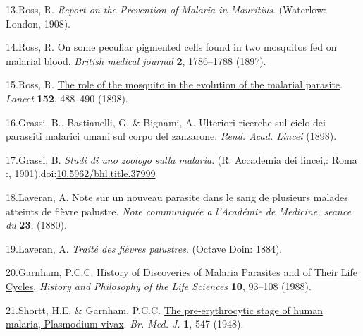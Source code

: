 \documentclass[
]{book}
\newlength{\cslhangindent}
\newlength{\cslentryspacingunit} %
\newenvironment{CSLReferences}[2] %
 {%
  \setlength{\parindent}{0pt}
  \ifodd #1
  \let\oldpar\par
  \def\par{\hangindent=\cslhangindent\oldpar}
  \fi
  \setlength{\parskip}{#2\cslentryspacingunit}
 }%
 {}
\begin{document}
\begin{CSLReferences}{0}{0}
\leavevmode{}%
13.Ross, R. \emph{Report on the {Prevention} of {Malaria} in {Mauritius}}. (Waterlow: London, 1908).

\leavevmode{}%
14.Ross, R. \href{http://www.bmj.com/content/2/1929/1786.full.pdf}{On some peculiar pigmented cells found in two mosquitos fed on malarial blood}. \emph{British medical journal} \textbf{2}, 1786--1788 (1897).

\leavevmode{}%
15.Ross, R. \href{https://scholar.archive.org/work/vejsrzltgva5nmudubd5oebje4/access/ia_file/crossref-pre-1909-scholarly-works/10.1016\%252Fs0140-6736\%252801\%252981394-5.zip/10.1016\%252Fs0140-6736\%252801\%252981400-8.pdf}{The role of the mosquito in the evolution of the malarial parasite}. \emph{Lancet} \textbf{152}, 488--490 (1898).

\leavevmode{}%
16.Grassi, B., Bastianelli, G. \& Bignami, A. Ulteriori ricerche sul ciclo dei parassiti malarici umani sul corpo del zanzarone. \emph{Rend. Acad. Lincei} (1898).

\leavevmode{}%
17.Grassi, B. \emph{Studi di uno zoologo sulla malaria}. (R. Accademia dei lincei,: Roma :, 1901).doi:\href{https://doi.org/10.5962/bhl.title.37999}{10.5962/bhl.title.37999}

\leavevmode{}%
18.Laveran, A. Note sur un nouveau parasite dans le sang de plusieurs malades atteints de fièvre palustre. \emph{Note communiquée a l'Académie de Medicine, seance du} \textbf{23}, (1880).

\leavevmode{}%
19.Laveran, A. \emph{Traité des fièvres palustres}. (Octave Doin: 1884).

\leavevmode{}%
20.Garnham, P.C.C. \href{https://www.jstor.org/stable/23329001}{History of {Discoveries} of {Malaria} {Parasites} and of {Their} {Life} {Cycles}}. \emph{History and Philosophy of the Life Sciences} \textbf{10}, 93--108 (1988).

\leavevmode{}%
21.Shortt, H.E. \& Garnham, P.C.C. \href{https://doi.org/10.1136/bmj.1.4550.547}{The pre-erythrocytic stage of human malaria, {Plasmodium} vivax}. \emph{Br. Med. J.} \textbf{1}, 547 (1948).


\end{CSLReferences}
\end{document}
